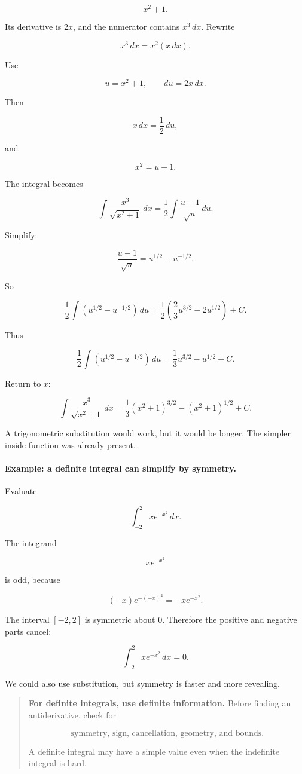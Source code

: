 \[
x^2+1.
\]

Its derivative is \(2x\), and the numerator contains \(x^3\,dx\).  Rewrite

\[
x^3\,dx=x^2(x\,dx).
\]

Use

\[
u=x^2+1,
\qquad
du=2x\,dx.
\]

Then

\[
x\,dx=\frac12\,du,
\]

and

\[
x^2=u-1.
\]

The integral becomes

\[
\int \frac{x^3}{\sqrt{x^2+1}}\,dx
=
\frac12\int \frac{u-1}{\sqrt{u}}\,du.
\]

Simplify:

\[
\frac{u-1}{\sqrt u}=u^{1/2}-u^{-1/2}.
\]

So

\[
\frac12\int \left(u^{1/2}-u^{-1/2}\right)\,du
=
\frac12\left(\frac23u^{3/2}-2u^{1/2}\right)+C.
\]

Thus

\[
\frac12\int \left(u^{1/2}-u^{-1/2}\right)\,du
=
\frac13u^{3/2}-u^{1/2}+C.
\]

Return to \(x\):

\[
\boxed{
\int \frac{x^3}{\sqrt{x^2+1}}\,dx
=
\frac13(x^2+1)^{3/2}
-
(x^2+1)^{1/2}
+C.
}
\]

A trigonometric substitution would work, but it would be longer.  The simpler inside
function was already present.

\paragraph{Example: a definite integral can simplify by symmetry.}
Evaluate

\[
\int_{-2}^{2} x e^{-x^2}\,dx.
\]

The integrand

\[
x e^{-x^2}
\]

is odd, because

\[
(-x)e^{-(-x)^2}=-xe^{-x^2}.
\]

The interval \([-2,2]\) is symmetric about \(0\).  Therefore the positive and negative
parts cancel:

\[
\boxed{
\int_{-2}^{2} x e^{-x^2}\,dx=0.
}
\]

We could also use substitution, but symmetry is faster and more revealing.

\begin{quote}
\textbf{For definite integrals, use definite information.}
Before finding an antiderivative, check for

\[
\text{symmetry, sign, cancellation, geometry, and bounds.}
\]

A definite integral may have a simple value even when the indefinite integral is hard.
\end{quote}

